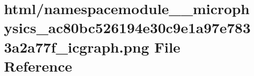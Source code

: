 \hypertarget{namespacemodule____microphysics__ac80bc526194e30c9e1a97e7833a2a77f__icgraph_8png}{}\section{html/namespacemodule\+\_\+\+\_\+microphysics\+\_\+ac80bc526194e30c9e1a97e7833a2a77f\+\_\+icgraph.png File Reference}
\label{namespacemodule____microphysics__ac80bc526194e30c9e1a97e7833a2a77f__icgraph_8png}
